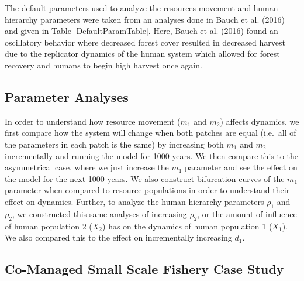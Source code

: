 \documentclass[
  12pt,
]{article}
\begin{document}
The default parameters used to analyze the resources movement and human hierarchy parameters were taken from an analyses done in Bauch et al. (2016) and given in Table \ref{DefaultParamTable}. Here, Bauch et al. (2016) found an oscillatory behavior where decreased forest cover resulted in decreased harvest due to the replicator dynamics of the human system which allowed for forest recovery and humans to begin high harvest once again.

\hypertarget{parameter-analyses}{%
\subsection{Parameter Analyses}\label{parameter-analyses}}

In order to understand how resource movement (\(m_1\) and \(m_2\)) affects dynamics, we first compare how the system will change when both patches are equal (i.e.~all of the parameters in each patch is the same) by increasing both \(m_1\) and \(m_2\) incrementally and running the model for 1000 years. We then compare this to the asymmetrical case, where we just increase the \(m_1\) parameter and see the effect on the model for the next 1000 years. We also construct bifurcation curves of the \(m_1\) parameter when compared to resource populations in order to understand their effect on dynamics. Further, to analyze the human hierarchy parameters \(\rho_1\) and \(\rho_2\), we constructed this same analyses of increasing \(\rho_2\), or the amount of influence of human population 2 (\(X_2\)) has on the dynamics of human population 1 (\(X_1\)). We also compared this to the effect on incrementally increasing \(d_1\).

\hypertarget{co-managed-small-scale-fishery-case-study}{%
\subsection{Co-Managed Small Scale Fishery Case Study}\label{co-managed-small-scale-fishery-case-study}}
\end{document}
